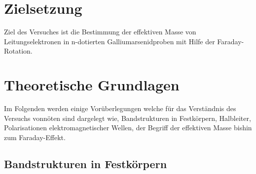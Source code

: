 \section{Zielsetzung}

Ziel des Versuches ist die Bestimmung der effektiven Masse von Leitungselektronen in n-dotierten Galliumarsenidproben mit Hilfe der Faraday-Rotation.

\section{Theoretische Grundlagen}

Im Folgenden werden einige Vorüberlegungen welche für das Verständnis des Versuchs vonnöten sind dargelegt wie, Bandstrukturen in Festkörpern, Halbleiter, Polarisationen elektromagnetischer Wellen, der
Begriff der effektiven Masse bishin zum Faraday-Effekt.

\subsection{Bandstrukturen in Festkörpern}

